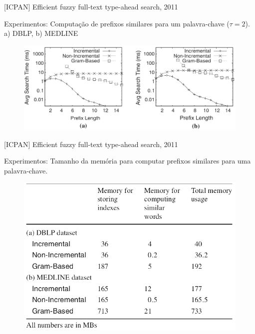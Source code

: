 \documentclass[11pt]{beamer}
\begin{document}
\begin{frame}{[ICPAN] Efficient fuzzy full-text type-ahead search, 2011}
    
    Experimentos: Computação de prefixos similares para um palavra-chave ($\tau = 2$). a) DBLP, b) MEDLINE

    \begin{figure}
      \includegraphics[scale=0.33]{pictures/icpan_4_ex.png}
      \centering
    \end{figure}
    
\end{frame}

\begin{frame}{[ICPAN] Efficient fuzzy full-text type-ahead search, 2011}
    
    Experimentos: Tamanho da memória para computar prefixos similares para uma palavra-chave.

    \begin{figure}
      \includegraphics[scale=0.37]{pictures/icpan_5_ex.png}
      \centering
    \end{figure}
    
\end{frame}
\end{document}
